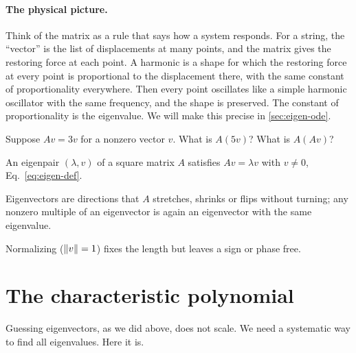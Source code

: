 \paragraph{The physical picture.} Think of the matrix as a rule that says how a system responds. For a string, the ``vector'' is the list of displacements at many points, and the matrix gives the restoring force at each point. A harmonic is a shape for which the restoring force at every point is proportional to the displacement there, with the same constant of proportionality everywhere. Then every point oscillates like a simple harmonic oscillator with the same frequency, and the shape is preserved. The constant of proportionality is the eigenvalue. We will make this precise in \cref{sec:eigen-ode}.

\begin{checkpoint}
Suppose $Av=3v$ for a nonzero vector $v$. What is $A(5v)$? What is $A(A v)$?
\end{checkpoint}

\begin{keyideas}
\item An eigenpair $(\lambda,v)$ of a square matrix $A$ satisfies $Av=\lambda v$ with $v\ne0$, Eq.~\eqref{eq:eigen-def}.
\item Eigenvectors are directions that $A$ stretches, shrinks or flips without turning; any nonzero multiple of an eigenvector is again an eigenvector with the same eigenvalue.
\item Normalizing ($\left\lVert v\right\rVert=1$) fixes the length but leaves a sign or phase free.
\end{keyideas}

\section{The characteristic polynomial}\label{sec:eigen-charpoly}

Guessing eigenvectors, as we did above, does not scale. We need a systematic way to find all eigenvalues. Here it is.

